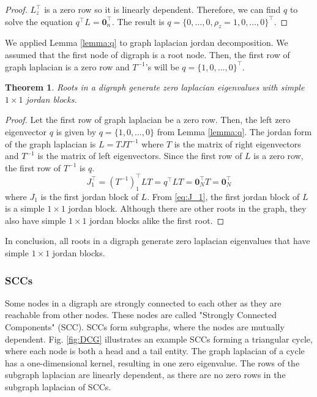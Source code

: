 \documentclass[letterpaper, 10 pt, conference]{ieeeconf}  %
\newtheorem{theorem}{Theorem}[section]
\begin{document}
\begin{proof}
\( L_z^\top \) is a zero row so it is linearly dependent. Therefore, we can find \( q \) to solve the equation \( q^\top L = \mathbf{0}_n^\top \). The result is \( q = \{0, \dots, 0, \rho_z = 1, 0, \dots, 0\}^\top \).
\end{proof}

We applied Lemma \ref{lemma:q} to graph laplacian jordan decomposition. We assumed that the first node of digraph is a root node. Then, the first row of graph laplacian is a zero row and \(T^{-1}\)'s will be \(q = \{1, 0, \dots , 0\}^\top \). 


\begin{theorem}
    Roots in a digraph generate zero laplacian eigenvalues with simple \(1 \times 1\) jordan blocks.
\end{theorem}

\begin{proof}
    Let the first row of graph laplacian be a zero row. Then, the left zero eigenvector \( q \) is given by \( q = \{1, 0, \dots , 0\} \) from Lemma \ref{lemma:q}. The jordan form of the graph laplacian is \( L = T J T^{-1} \) where \( T \) is the matrix of right eigenvectors and \( T^{-1} \) is the matrix of left eigenvectors. Since the first row of \( L \) is a zero row, the first row of \( T^{-1} \) is \( q \). 
    \begin{equation}\label{eq:J_1}
        J_1^\top = (T^{-1})_1^\top L T = q^\top L T = \mathbf{0}_N^\top T = \mathbf{0}_N^\top
    \end{equation}
    \noindent where \( J_1 \) is the first jordan block of \( L \). From \eqref{eq:J_1}, the first jordan block of \( L \) is a simple \(1 \times 1\) jordan block. Although there are other roots in the graph, they also have simple \(1 \times 1\) jordan blocks alike the first root.
\end{proof}

In conclusion, all roots in a digraph generate zero laplacian eigenvalues that have simple \(1 \times 1\) jordan blocks.

\subsubsection{SCCs}

Some nodes in a digraph are strongly connected to each other as they are reachable from other nodes. These nodes are called "Strongly Connected Components" (SCC). SCCs form subgraphs, where the nodes are mutually dependent. Fig. \ref{fig:DCG} illustrates an example SCCs forming a triangular cycle, where each node is both a head and a tail entity. The graph laplacian of a cycle has a one-dimensional kernel, resulting in one zero eigenvalue. The rows of the subgraph laplacian are linearly dependent, as there are no zero rows in the subgraph laplacian of SCCs. 
\end{document}

